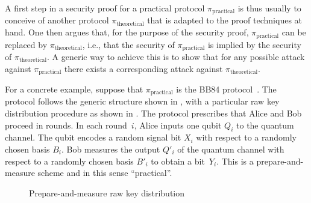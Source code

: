 A first step in a security proof for a practical protocol $\pi_{\mathrm{practical}}$ is thus usually to conceive of another protocol $\pi_{\mathrm{theoretical}}$ that is adapted to the proof techniques at hand. One then argues that, for the purpose of the security proof, $\pi_{\mathrm{practical}}$ can be replaced by $\pi_{\mathrm{theoretical}}$, i.e., that the security of $\pi_{\mathrm{practical}}$ is implied by the security of $\pi_{\mathrm{theoretical}}$. A generic way to achieve this is to show that for any possible attack against $\pi_{\mathrm{practical}}$ there exists a corresponding attack against $\pi_{\mathrm{theoretical}}$.

For a concrete example, suppose that $\pi_{\mathrm{practical}}$ is the BB84 protocol~\cite{BB84}. The protocol follows the generic structure shown in , with a particular raw key distribution procedure as shown in . The protocol prescribes that Alice and Bob proceed in rounds. In each round~$i$, Alice inputs one qubit $Q_i$ to the quantum channel.  The qubit encodes a random signal bit $X_i$ with respect to a randomly chosen basis $B_i$. Bob measures the output $Q'_i$ of the quantum channel with respect to a randomly chosen basis $B'_i$ to obtain a bit~$Y_i$. This is a prepare-and-measure scheme and in this sense ``practical''.

\begin{figure}[h]
\noindent{}
\caption{Prepare-and-measure raw key distribution \label{fig:BB84RawKeyDistribution}}
\end{figure}

